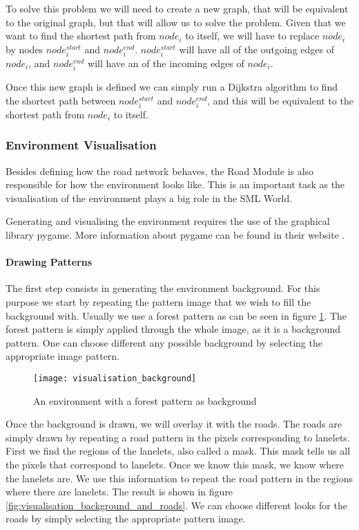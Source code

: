 To solve this problem we will need to create a new graph, that will be equivalent to the original graph, but that will allow us to solve the problem. Given that we want to find the shortest path from $node_i$ to itself, we will have to replace $node_i$ by nodes $node_i^{start}$ and $node_i^{end}$. $node_i^{start}$ will have all of the outgoing edges of $node_i$, and $node_i^{end}$ will have an of the incoming edges of $node_i$. 

Once this new graph is defined we can simply run a Dijkstra algorithm to find the shortest path between $node_i^{start}$ and $node_i^{end}$, and this will be equivalent to the shortest path from $node_i$ to itself.

\subsubsection{Environment Visualisation}

Besides defining how the road network behaves, the Road Module is also responsible for how the environment looks like. This is an important task as the visualisation of the environment plays a big role in the SML World.

Generating and visualising the environment requires the use of the graphical library pygame. More information about pygame can be found in their website \cite{pygame}.

\paragraph{Drawing Patterns}

The first step consists in generating the environment background. For this purpose we start by repeating the pattern image that we wish to fill the background with. Usually we use a forest pattern as can be seen in figure \ref{fig:visualisation_background}. The forest pattern is simply applied through the whole image, as it is a background pattern. One can choose different any possible background by selecting the appropriate image pattern.

\begin{figure}[h!]
  \centering
    \texttt{[image: visualisation\_background]}
    \caption{An environment with a forest pattern as background \label{fig:visualisation_background} }
\end{figure}

Once the background is drawn, we will overlay it with the roads. The roads are simply drawn by repeating a road pattern in the pixels corresponding to lanelets. First we find the regions of the lanelets, also called a mask. This mask tells us all the pixels that correspond to lanelets. Once we know this mask, we know where the lanelets are. We use this information to repeat the road pattern in the regions where there are lanelets. The result is shown in figure \ref{fig:visualisation_background_and_roads}. We can choose different looks for the roads by simply selecting the appropriate pattern image. 

